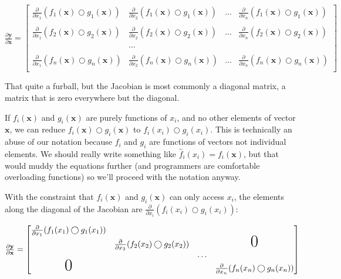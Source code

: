 \documentclass[11pt]{article}
\begin{document}
$
\frac{\partial \mathbf{y}}{\partial \mathbf{x}}  = \begin{bmatrix}
\frac{\partial}{\partial x_1} ( f_{1}(\mathbf{x}) \bigcirc g_{1}(\mathbf{x}) ) & \frac{\partial}{\partial x_2} ( f_{1}(\mathbf{x}) \bigcirc g_{1}(\mathbf{x}) ) & \ldots & \frac{\partial}{\partial x_n} ( f_{1}(\mathbf{x}) \bigcirc g_{1}(\mathbf{x}) )\\\\
\frac{\partial}{\partial x_1} ( f_{2}(\mathbf{x}) \bigcirc g_{2}(\mathbf{x}) ) & \frac{\partial}{\partial x_2} ( f_{2}(\mathbf{x}) \bigcirc g_{2}(\mathbf{x}) ) & \ldots & \frac{\partial}{\partial x_n} ( f_{2}(\mathbf{x}) \bigcirc g_{2}(\mathbf{x}) )\\\\
& \ldots\\\\
\frac{\partial}{\partial x_1} ( f_{n}(\mathbf{x}) \bigcirc g_{n}(\mathbf{x}) ) & \frac{\partial}{\partial x_2} ( f_{n}(\mathbf{x}) \bigcirc g_{n}(\mathbf{x}) ) & \ldots & \frac{\partial}{\partial x_n} ( f_{n}(\mathbf{x}) \bigcirc g_{n}(\mathbf{x}) )\\
\end{bmatrix}
$

That quite a furball, but the Jacobian is most commonly a diagonal matrix, a matrix that is zero everywhere but the diagonal. 

If $f_i(\mathbf{x})$ and $g_i(\mathbf{x})$ are purely functions of $x_i$, and no other elements of vector $\mathbf{x}$, we can reduce $f_i(\mathbf{x}) \bigcirc g_i(\mathbf{x})$ to $f_i(x_i) \bigcirc g_i(x_i)$. This is technically an abuse of our notation because $f_i$ and $g_i$ are functions of vectors not individual elements. We should really write something like $\hat f_{i}(x_i) = f_{i}(\mathbf{x})$, but that would muddy the equations further (and programmers are comfortable overloading functions) so we'll proceed with the notation anyway.

With the constraint that $f_i(\mathbf{x})$ and $g_i(\mathbf{x})$ can only access $x_i$, the elements along the diagonal of the Jacobian are $\frac{\partial}{\partial x_i} ( f_i(x_i) \bigcirc g_i(x_i) )$:

$
\frac{\partial \mathbf{y}}{\partial \mathbf{x}}  = \begin{bmatrix}
\frac{\partial}{\partial x_1} ( f_{1}(x_1) \bigcirc g_{1}(x_1) )\\
& \frac{\partial}{\partial x_2} (f_{2}(x_2) \bigcirc g_{2}(x_2) ) & &\text{\huge0}\\
& & \ldots \\
\text{\huge0}& & & \frac{\partial}{\partial x_n} (f_{n}(x_n) \bigcirc g_{n}(x_n) )
\end{bmatrix}
$
\end{document}
